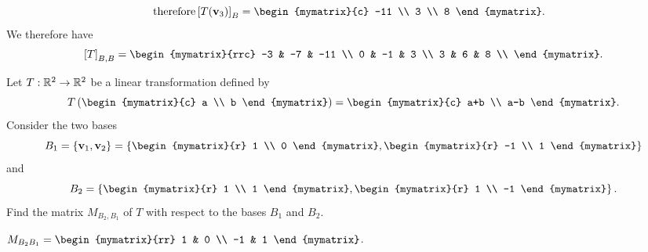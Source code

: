 \begin{ex}
\begin{sol}
\begin{enumerate}
\begin{equation*}
          \quad\mbox{therefore}
          \coord{T(\vect{v}_3)}_B =
          \begin{mymatrix}{c} -11 \\ 3 \\ 8 \end{mymatrix}.
        \end{equation*}
        We therefore have
        \begin{equation*}
          \coord{T}_{B,B} = 
          \begin{mymatrix}{rrc}
            -3 & -7 & -11 \\
            0  & -1 &   3 \\
            3  &  6 &   8 \\
          \end{mymatrix}.
        \end{equation*}
      \end{enumerate}
\end{sol}
\end{ex}

\begin{ex}
  Let $T: \mathbb{R}^2 \to \mathbb{R}^2$ be a linear transformation defined by
  \begin{equation*}
    T \paren{\begin{mymatrix}{c} a \\ b \end{mymatrix}}
    = \begin{mymatrix}{c} a+b \\ a-b \end{mymatrix}.
  \end{equation*}
  Consider the two bases
  \begin{equation*}
    B_1 = \set{\vect{v}_{1}, \vect{v}_{2} }
    = \set{\begin{mymatrix}{r} 1 \\ 0 \end{mymatrix},
      \begin{mymatrix}{r} -1 \\ 1 \end{mymatrix}
    }
  \end{equation*}
  and
  \begin{equation*}
    B_2 = \set{\begin{mymatrix}{r} 1 \\ 1 \end{mymatrix},
      \begin{mymatrix}{r} 1 \\ -1 \end{mymatrix}
    }.
  \end{equation*}
  Find the matrix $M_{B_2,B_1}$ of $T$ with respect to the bases $B_1$
  and $B_2$.
  \begin{sol}
    $M_{B_{2} B_{1}} = \begin{mymatrix}{rr}
      1 & 0 \\
      -1 & 1
    \end{mymatrix}$.
  \end{sol}
\end{ex}


